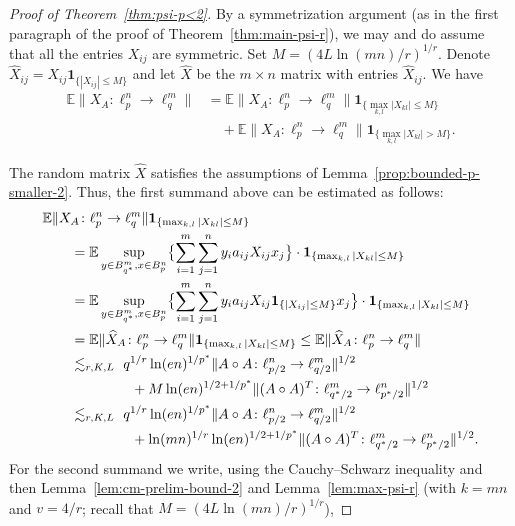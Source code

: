 \documentclass[a4paper]{amsart}
\theoremstyle{definition}
\theoremstyle{remark}
\numberwithin{equation}{section}
\newcommand*{\EE}{\mathbb{E}}
\newcommand*{\hadprod}{\mathbin{\circ}} %
\newcommand*{\ind}{\mathbf{1}} %
\begin{document}
\begin{proof}[Proof of Theorem~\ref{thm:psi-p<2}] 	
	By a symmetrization argument (as in the first  paragraph of the proof of Theorem~\ref{thm:main-psi-r}),
	we may and do assume  that all the entries $X_{ij}$ are symmetric.
		Set $M = (4 L \ln(mn)/r)^{1/r}$.
		Denote $\widehat{X}_{ij} = X_{ij} \ind_{\{|X_{ij}|\leq M\}}$
		and let $\widehat{X}$ be the $m\times n$ matrix with entries $\widehat{X}_{ij}$.
		We have
		\begin{align*}
		\EE \|X_A \colon \ell^n_p\to \ell^m_q\|
		&= \EE \|X_A \colon \ell^n_p\to \ell^m_q\| \ind_{\{ \max_{k,l} |X_{kl}|\leq M\}} \\
		&\quad+ \EE \|X_A \colon \ell^n_p\to \ell^m_q\| \ind_{\{ \max_{k,l} |X_{kl}|> M\}}.
		\end{align*}
		
				The random matrix $\widehat{X}$ satisfies the assumptions of Lemma~\ref{prop:bounded-p-smaller-2}. Thus, the first summand above can be estimated as follows:
		\begin{align*}
		\MoveEqLeft
		\EE \|X_A \colon \ell^n_p\to \ell^m_q\| \ind_{\{ \max_{k,l} |X_{kl}|\leq M\}}\\
		& = \EE \sup_{y\in B_{q^*}^m, x\in B_p^n} \bigl\{ \sum_{i=1}^m \sum_{j=1}^n y_i a_{ij} X_{ij} x_j \bigr\}
		\cdot \ind_{\{ \max_{k,l} |X_{kl}|\leq M\}} \\
		& = \EE \sup_{y\in B_{q^*}^m, x\in B_p^n}\bigl\{\sum_{i=1}^m \sum_{j=1}^n y_i a_{ij} X_{ij} \ind_{\{|X_{ij}|\leq M\}} x_j \bigr\}
		\cdot \ind_{\{ \max_{k,l} |X_{kl}|\leq M\}} \\
		&= \EE \|\widehat{X}_A \colon \ell^n_p\to \ell^m_q\| \ind_{\{ \max_{k,l} |X_{kl}|\leq M\}}
		\leq  \EE \|\widehat{X}_A \colon \ell^n_p\to \ell^m_q\| \\
		&\lesssim_{r, K, L} \
	       q^{1/r}\ln(en)^{1/p^*} \|A\hadprod A \colon \ell^n_{p/2} \to \ell^m_{q/2}\|^{1/2}\\
		&\qquad\qquad\ +M \ln(en)^{1/2+1/p^*}  \|(A\hadprod A)^T \colon \ell^m_{q^*/2} \to \ell^n_{p^*/2}\|^{1/2}
		\\
		&\lesssim_{r, K, L} \
	        q^{1/r} \ln(en)^{1/p^*} \|A\hadprod A \colon \ell^n_{p/2} \to \ell^m_{q/2}\|^{1/2}\\
		&\qquad\qquad\ +  \ln(mn)^{1/r} \ln(en)^{1/2+1/p^*}  \|(A\hadprod A)^T \colon \ell^m_{q^*/2} \to \ell^n_{p^*/2}\|^{1/2}.
		\end{align*}
		For the second summand we write,
		using the Cauchy--Schwarz inequality
		and then Lemma~\ref{lem:cm-prelim-bound-2}
		 and Lemma~\ref{lem:max-psi-r} (with $k=mn$ and $v=4/r$; recall that $M = (4 L \ln(mn)/r)^{1/r}$),

\end{proof}
\end{document}
